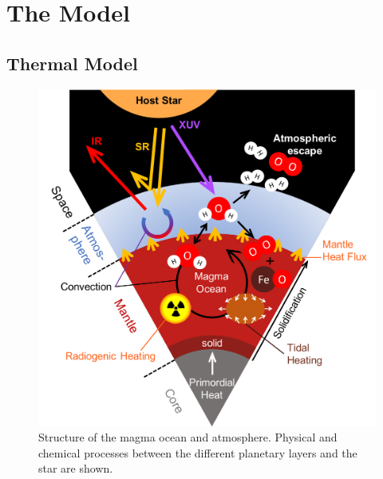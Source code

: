 \documentclass[oneside,twocolumn]{article}
\begin{document}
\section{The Model}
\label{Sec_Model}

\subsection{Thermal Model}
\label{sec_therm_model}
\begin{figure}
    \centering
    \includegraphics[width=\columnwidth]{BarthFig1.pdf}
    \caption{Structure of the magma ocean and atmosphere. Physical and chemical processes between the different planetary layers and the star are shown.}
    \label{struc_magma}
\end{figure}
\end{document}
